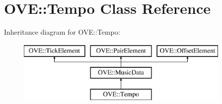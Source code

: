 \hypertarget{class_o_v_e_1_1_tempo}{}\section{O\+VE\+:\+:Tempo Class Reference}
\label{class_o_v_e_1_1_tempo}
Inheritance diagram for O\+VE\+:\+:Tempo\+:\begin{figure}[H]
\begin{center}
\leavevmode
\includegraphics[height=3.000000cm]{class_o_v_e_1_1_tempo}
\end{center}
\end{figure}
